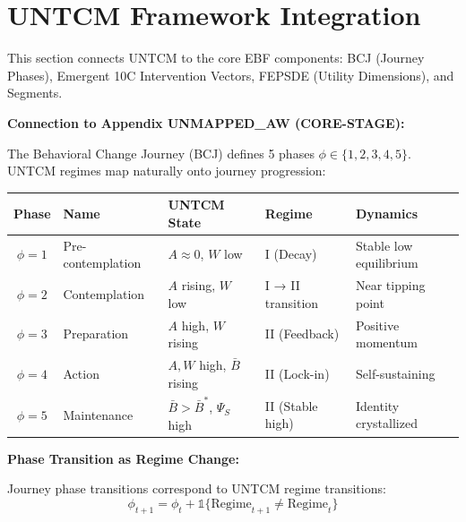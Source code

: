 
\section{UNTCM Framework Integration}
\label{sec:untcm-integration}

This section connects UNTCM to the core EBF components: BCJ (Journey Phases), Emergent 10C Intervention Vectors, FEPSDE (Utility Dimensions), and Segments.

\begin{tcolorbox}[colback=blue!5!white, colframe=blue!75!black,
    title=\textbf{Integration UNTCM-I1: BCJ Journey Phase Mapping}]

\textbf{Connection to Appendix UNMAPPED_AW (CORE-STAGE):}

The Behavioral Change Journey (BCJ) defines 5 phases $\phi \in \{1, 2, 3, 4, 5\}$. UNTCM regimes map naturally onto journey progression:

\begin{center}
\renewcommand{\arraystretch}{1.3}
\begin{tabular}{@{}cllll@{}}
\toprule
\textbf{Phase} & \textbf{Name} & \textbf{UNTCM State} & \textbf{Regime} & \textbf{Dynamics} \\
\midrule
$\phi = 1$ & Pre-contemplation & $A \approx 0$, $W$ low & I (Decay) & Stable low equilibrium \\
$\phi = 2$ & Contemplation & $A$ rising, $W$ low & I → II transition & Near tipping point \\
$\phi = 3$ & Preparation & $A$ high, $W$ rising & II (Feedback) & Positive momentum \\
$\phi = 4$ & Action & $A, W$ high, $\bar{B}$ rising & II (Lock-in) & Self-sustaining \\
$\phi = 5$ & Maintenance & $\bar{B} > \bar{B}^*$, $\Psi_S$ high & II (Stable high) & Identity crystallized \\
\bottomrule
\end{tabular}
\end{center}

\textbf{Phase Transition as Regime Change:}

Journey phase transitions correspond to UNTCM regime transitions:
\begin{equation}
\phi_{t+1} = \phi_t + \mathbb{1}\{\text{Regime}_{t+1} \neq \text{Regime}_t\}
\end{equation}


\end{tcolorbox}
